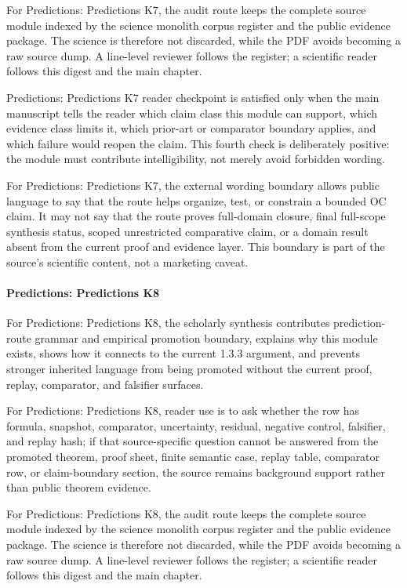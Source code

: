 For Predictions: Predictions K7, the audit route keeps the complete source module indexed by the science monolith corpus register and the public evidence package. The science is therefore not discarded, while the PDF avoids becoming a raw source dump. A line-level reviewer follows the register; a scientific reader follows this digest and the main chapter.


Predictions: Predictions K7 reader checkpoint is satisfied only when the main manuscript tells the reader which claim class this module can support, which evidence class limits it, which prior-art or comparator boundary applies, and which failure would reopen the claim. This fourth check is deliberately positive: the module must contribute intelligibility, not merely avoid forbidden wording.


For Predictions: Predictions K7, the external wording boundary allows public language to say that the route helps organize, test, or constrain a bounded OC claim. It may not say that the route proves full-domain closure, final full-scope synthesis status, scoped unrestricted comparative claim, or a domain result absent from the current proof and evidence layer. This boundary is part of the source's scientific content, not a marketing caveat.


\paragraph{Predictions: Predictions K8}

For Predictions: Predictions K8, the scholarly synthesis contributes prediction-route grammar and empirical promotion boundary, explains why this module exists, shows how it connects to the current 1.3.3 argument, and prevents stronger inherited language from being promoted without the current proof, replay, comparator, and falsifier surfaces.


For Predictions: Predictions K8, reader use is to ask whether the row has formula, snapshot, comparator, uncertainty, residual, negative control, falsifier, and replay hash; if that source-specific question cannot be answered from the promoted theorem, proof sheet, finite semantic case, replay table, comparator row, or claim-boundary section, the source remains background support rather than public theorem evidence.


For Predictions: Predictions K8, the audit route keeps the complete source module indexed by the science monolith corpus register and the public evidence package. The science is therefore not discarded, while the PDF avoids becoming a raw source dump. A line-level reviewer follows the register; a scientific reader follows this digest and the main chapter.


